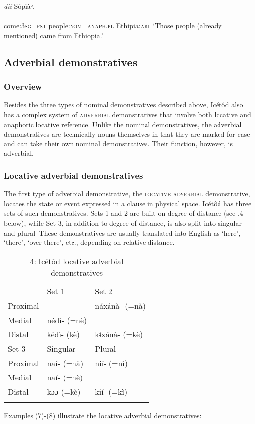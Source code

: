 \ea\label{ex:}
 \textit{díí}            Sópìàᵒ. \\
    \\
come:\textsc{3sg}=\textsc{pst}   people:\textsc{nom}=\textsc{anaph.pl}  Ethipia:\textsc{abl}
\glt ‘Those people (already mentioned) came from Ethiopia.’ 
\z






\subsection{Adverbial demonstratives}
\subsubsection{Overview}

Besides the three types of nominal demonstratives described above, Icétôd also has a complex system of \textsc{adverbial} demonstratives that involve both locative and anaphoric locative reference. Unlike the nominal demonstratives, the adverbial demonstratives are technically nouns themselves in that they are marked for case and can take their own nominal demonstratives. Their function, however, is adverbial.


\subsubsection{Locative adverbial demonstratives}

The first type of adverbial demonstrative, the \textsc{locative adverbial} demonstrative, locates the state or event expressed in a clause in physical space. Icétôd has three sets of such demonstratives. Sets 1 and 2 are built on degree of distance (see .4 below), while Set 3, in addition to degree of distance, is also split into singular and plural. These demonstratives are usually translated into English as ‘here’, ‘there’, ‘over there’, etc., depending on relative distance. 


\begin{table}
\caption{4: Icétôd locative adverbial demonstratives}
\label{tab:6}


\begin{tabularx}{\textwidth}{XXX} & \multicolumn{1}{X}{Set 1} & Set 2\\
\lsptoprule
Proximal & \multicolumn{1}{X}{} & náxánà- (=nà)\\
Medial & \multicolumn{1}{X}{nédì- (=nè)} & \\
Distal & \multicolumn{1}{X}{kédì- (kè)} & kɨxánà- (=kè)\\
\multicolumn{1}{X}{Set 3} & Singular & Plural\\
Proximal & naí- (=nà) & nií- (=nì)\\
Medial & naí- (=nè) & \\
Distal & kɔɔ (=kè) & kií- (=kì)\\
\lspbottomrule
\end{tabularx}
\end{table}
Examples (7)-(8) illustrate the locative adverbial demonstratives:




